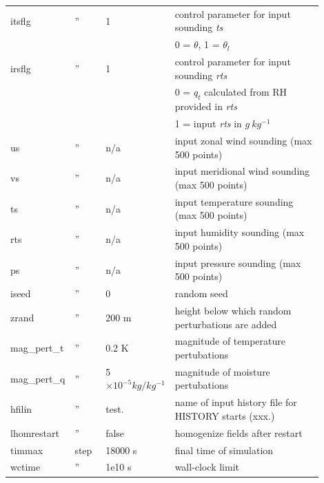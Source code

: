 \documentclass[11pt,a4paper]{article}
\begin{document}
\begin{longtable}[htb]{p{0.12\linewidth}p{0.1\linewidth}p{0.18\linewidth}p{0.5\linewidth}}
itsflg       &  ''  & 1                   & control parameter for input sounding \textit{ts}      \\ 
             &      &                     & \hspace{2mm} 0 = $\theta$, 1 = $\theta_l$             \\
irsflg       &  ''  & 1                   & control parameter for input sounding \textit{rts}     \\
             &      &                     & \hspace{2mm} 0 = $q_t$ calculated from RH provided in \textit{rts} \\
             &      &                     & \hspace{2mm} 1 = input \textit{rts} in $g \ kg^{-1}$  \\
us           &  ''  & n/a                 & input zonal wind sounding (max 500 points)            \\
vs           &  ''  & n/a                 & input meridional wind sounding (max 500 points)       \\
ts           &  ''  & n/a                 & input temperature sounding (max 500 points)           \\
rts          &  ''  & n/a                 & input humidity sounding (max 500 points)              \\
ps           &  ''  & n/a                 & input pressure sounding (max 500 points)              \\
iseed        &  ''  & 0                   & random seed                                           \\
zrand        &  ''  & 200 m               & height below which random perturbations are added     \\
mag\_pert\_t &  ''  & 0.2 K               & magnitude of temperature pertubations                 \\
mag\_pert\_q &  ''  & 5 $\times 10^{-5} kg / kg^{-1}$ & magnitude of moisture pertubations        \\
hfilin       &  ''  & test.               & name of input history file for HISTORY starts (xxx.)  \\
lhomrestart  &  ''  & false               & homogenize fields after restart                       \\
\hline
timmax       & step & 18000 s             & final time of simulation                              \\ 
wctime       &  ''  & 1e10 s              & wall-clock limit                                      \\

\end{longtable}
\end{document}
